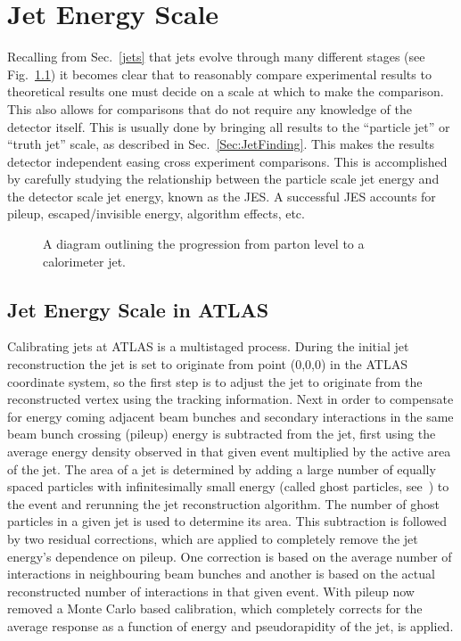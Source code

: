 \chapter{Jet Energy Scale}
\label{JES}

Recalling from Sec.~\ref{jets} that jets evolve through many different stages (see Fig.~\ref{JetLevelsFig}) it becomes clear that to reasonably compare experimental results to theoretical results one must decide on a scale at which to make the comparison.  
This also allows for comparisons that do not require any knowledge of the detector itself.  
This is usually done by bringing all results to the ``particle jet'' or ``truth jet'' scale, as described in Sec.~\ref{Sec:JetFinding}.  
This makes the results detector independent easing cross experiment comparisons.  
This is accomplished by carefully studying the relationship between the particle scale jet energy and the detector scale jet energy, known as the \gls{JES}.   
A successful \gls{JES} accounts for pileup, escaped/invisible energy, algorithm effects, etc.  


\begin{figure}[!ht]
  \begin{center}
  \end{center}
  \caption[Jet showering evolution.]
      {\small A diagram outlining the progression from parton level to a calorimeter jet.}
  \label{JetLevelsFig}
\end{figure}

\section{Jet Energy Scale in ATLAS}
\label{ATLASJES}

Calibrating jets at ATLAS is a multistaged process.  
During the initial jet reconstruction the jet is set to originate from point (0,0,0) in the ATLAS coordinate system, so the first step is to adjust the jet to originate from the reconstructed vertex using the tracking information.  
Next in order to compensate for energy coming adjacent beam bunches and secondary interactions in the same beam bunch crossing (pileup) energy is subtracted from the jet, first using the average energy density observed in that given event multiplied by the active area of the jet.  
The area of a jet is determined by adding a large number of equally spaced particles with infinitesimally small energy (called ghost particles, see~\cite{Soyez:2012hv}) to the event and rerunning the jet reconstruction algorithm.  
The number of ghost particles in a given jet is used to determine its area.  
This subtraction is followed by two residual corrections, which are applied to completely remove the jet energy's dependence on pileup.  
One correction is based on the average number of interactions in neighbouring beam bunches and another is based on the actual reconstructed number of interactions in that given event.    
With pileup now removed a Monte Carlo based calibration, which completely corrects for the average response as a function of energy and pseudorapidity of the jet, is applied.  

